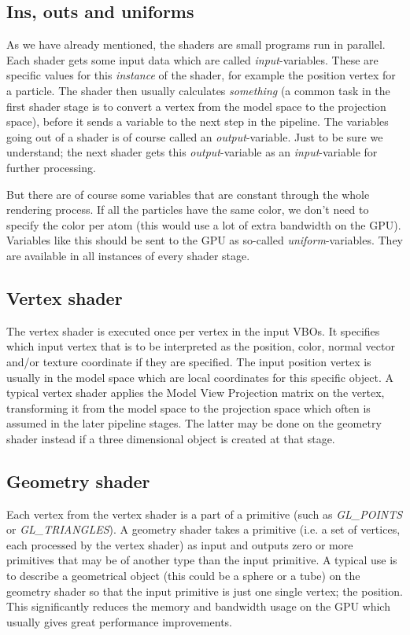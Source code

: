 \subsection{Ins, outs and uniforms}
\label{sec:opengl_uniforms}
As we have already mentioned, the shaders are small programs run in parallel. Each shader gets some input data which are called \textit{input}-variables. These are specific values for this \textit{instance} of the shader, for example the position vertex for a particle. The shader then usually calculates \textit{something} (a common task in the first shader stage is to convert a vertex from the model space to the projection space), before it sends a variable to the next step in the pipeline. The variables going out of a shader is of course called an \textit{output}-variable. Just to be sure we understand; the next shader gets this \textit{output}-variable as an \textit{input}-variable for further processing.

But there are of course some variables that are constant through the whole rendering process. If all the particles have the same color, we don't need to specify the color per atom (this would use a lot of extra bandwidth on the GPU). Variables like this should be sent to the GPU as so-called \textit{uniform}-variables. They are available in all instances of every shader stage.

\subsection{Vertex shader}
The vertex shader is executed once per vertex in the input VBOs. It specifies which input vertex that is to be interpreted as the position, color, normal vector and/or texture coordinate if they are specified. The input position vertex is usually in the model space which are local coordinates for this specific object. A typical vertex shader applies the Model View Projection matrix on the vertex, transforming it from the model space to the projection space which often is assumed in the later pipeline stages. The latter may be done on the geometry shader instead if a three dimensional object is created at that stage.

\subsection{Geometry shader}
Each vertex from the vertex shader is a part of a primitive (such as \textit{GL\_POINTS} or \textit{GL\_TRIANGLES}). A geometry shader takes a primitive (i.e. a set of vertices, each processed by the vertex shader) as input and outputs zero or more primitives that may be of another type than the input primitive. A typical use is to describe a geometrical object (this could be a sphere or a tube) on the geometry shader so that the input primitive is just one single vertex; the position. This significantly reduces the memory and bandwidth usage on the GPU which usually gives great performance improvements.

